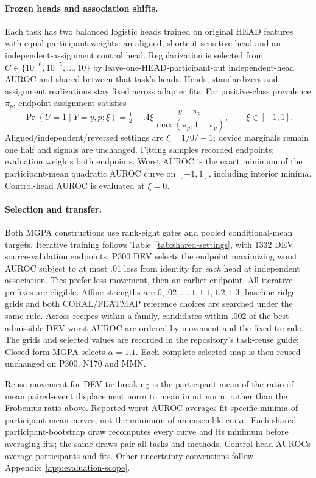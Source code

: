 \paragraph{Frozen heads and association shifts.}
Each task has two balanced logistic heads trained on original HEAD features
with equal participant weights: an aligned, shortcut-sensitive head and an
independent-assignment control head. Regularization is selected from
$C\in\{10^{-6},10^{-5},\ldots,10\}$ by leave-one-HEAD-participant-out
independent-head AUROC and shared between that task's heads. Heads,
standardizers and assignment realizations stay fixed across adapter fits.
For positive-class prevalence $\pi_p$, endpoint assignment satisfies
\[
 \Pr(U=1\mid Y=y,p;\xi)=\tfrac12+.4\xi
 \frac{y-\pi_p}{\max(\pi_p,1-\pi_p)},\qquad \xi\in[-1,1].
\]
Aligned/independent/reversed settings are $\xi=1/0/-1$; device marginals
remain one half and signals are unchanged. Fitting samples recorded
endpoints; evaluation weights both endpoints. Worst AUROC is the exact
minimum of the participant-mean quadratic AUROC curve on $[-1,1]$,
including interior minima. Control-head AUROC is evaluated at $\xi=0$.

\paragraph{Selection and transfer.}
Both MGPA constructions use rank-eight gates and pooled conditional-mean
targets. Iterative training follows Table~\ref{tab:shared-settings}, with
1332 DEV source-validation endpoints. P300 DEV selects the endpoint
maximizing worst AUROC subject to at most $.01$ loss from identity for
\emph{each} head at independent association. Ties prefer less movement,
then an earlier endpoint. All iterative prefixes are eligible. Affine
strengths are $0,.02,\ldots,1,1.1,1.2,1.3$; baseline ridge grids and both
CORAL/FEATMAP reference choices are searched under the same rule. Across
recipes within a family, candidates within $.002$ of the best admissible
DEV worst AUROC are ordered by movement and the fixed tie rule. The grids
and selected values are recorded in the repository's task-reuse guide;
Closed-form MGPA selects $\alpha=1.1$. Each complete selected map is then
reused unchanged on P300, N170 and MMN.

Reuse movement for DEV tie-breaking is the participant mean of the ratio
of mean paired-event displacement norm to mean input norm, rather than the
Frobenius ratio above. Reported worst AUROC averages fit-specific minima
of participant-mean curves, not the minimum of an ensemble curve.
Each shared participant-bootstrap draw recomputes every curve and its
minimum before averaging fits; the same draws pair all tasks and methods.
Control-head AUROCs average participants and fits. Other uncertainty
conventions follow Appendix~\ref{app:evaluation-scope}.
